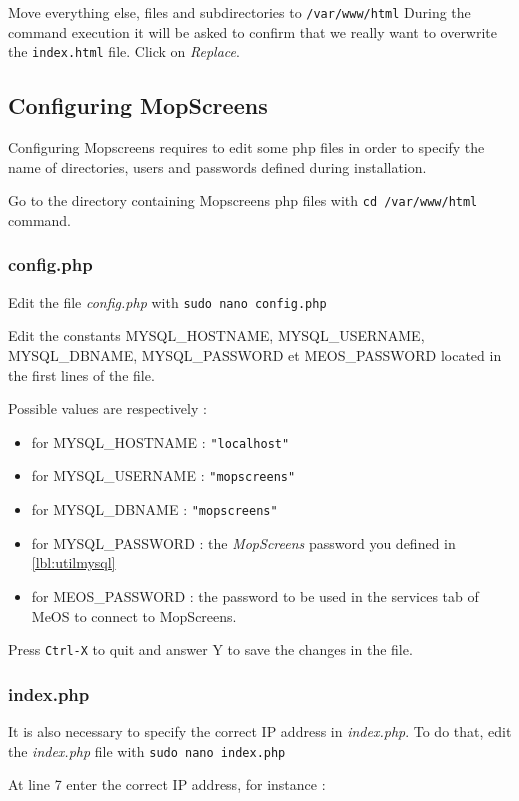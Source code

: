 \documentclass[a4paper]{ffco-rapport}
\begin{document}
		Move everything else, files and subdirectories to \verb|/var/www/html| During the command execution it will be asked to confirm that we really want to overwrite the \verb|index.html| file. Click on \emph{Replace}.
		
	\subsection{Configuring MopScreens}
		Configuring Mopscreens requires to edit some php files in order to specify the name of directories, users and passwords defined during installation.
	
		Go to the directory containing Mopscreens php files with \verb|cd /var/www/html| command.

		\subsubsection{config.php}
		Edit the file \emph{config.php} with \verb|sudo nano config.php|
		
		Edit the constants MYSQL\_HOSTNAME, MYSQL\_USERNAME, MYSQL\_DBNAME, MYSQL\_PASSWORD et MEOS\_PASSWORD located in the first lines of the file.
		
		Possible values are respectively :
		
		\begin{itemize}
			\item for MYSQL\_HOSTNAME : \texttt{"localhost"}
			\item for MYSQL\_USERNAME : \texttt{"mopscreens"}
			\item for MYSQL\_DBNAME : \texttt{"mopscreens"}
			\item for MYSQL\_PASSWORD : the \emph{MopScreens} password you defined in \ref{lbl:utilmysql}
			\item for MEOS\_PASSWORD :  the password to be used in the \og{}services\fg{} tab of MeOS to connect to MopScreens.
		\end{itemize}
		
		Press \verb|Ctrl-X| to quit and answer Y to save the changes in the file.
		
		\subsubsection{index.php}
			It is also necessary to specify the correct IP address in \emph{index.php}.
			To do that, edit the \emph{index.php} file with \verb|sudo nano index.php|
			
			At line 7 enter the correct IP address, for instance :
			
\end{document}
